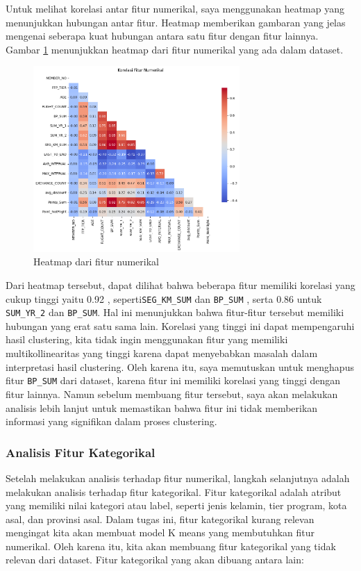 Untuk melihat korelasi antar fitur numerikal, saya menggunakan heatmap yang menunjukkan hubungan antar fitur. Heatmap memberikan gambaran yang jelas mengenai seberapa kuat hubungan antara satu fitur dengan fitur lainnya. Gambar \ref{fig:heatmap} menunjukkan heatmap dari fitur numerikal yang ada dalam dataset.

\begin{figure}[H]
    \centering
    \includegraphics[width=0.7\textwidth]{gambar/heatmap.png}
    \caption{Heatmap dari fitur numerikal}
    \label{fig:heatmap}
\end{figure}

Dari heatmap tersebut, dapat dilihat bahwa beberapa fitur memiliki korelasi yang cukup tinggi yaitu 0.92 , seperti\texttt{SEG\_KM\_SUM} dan \texttt{BP\_SUM} , serta 0.86 untuk \texttt{SUM\_YR\_2} dan \texttt{BP\_SUM}. Hal ini menunjukkan bahwa fitur-fitur tersebut memiliki hubungan yang erat satu sama lain. Korelasi yang tinggi ini dapat mempengaruhi hasil clustering, kita tidak ingin menggunakan fitur yang memiliki multikollinearitas yang tinggi karena dapat menyebabkan masalah dalam interpretasi hasil clustering. Oleh karena itu, saya memutuskan untuk menghapus fitur \texttt{BP\_SUM} dari dataset, karena fitur ini memiliki korelasi yang tinggi dengan fitur lainnya. Namun sebelum membuang fitur tersebut, saya akan melakukan analisis lebih lanjut untuk memastikan bahwa fitur ini tidak memberikan informasi yang signifikan dalam proses clustering.

\subsubsection{Analisis Fitur Kategorikal}
Setelah melakukan analisis terhadap fitur numerikal, langkah selanjutnya adalah melakukan analisis terhadap fitur kategorikal. Fitur kategorikal adalah atribut yang memiliki nilai kategori atau label, seperti jenis kelamin, tier program, kota asal, dan provinsi asal. Dalam tugas ini, fitur kategorikal kurang relevan mengingat kita akan membuat model K means yang membutuhkan fitur numerikal. Oleh karena itu, kita akan membuang fitur kategorikal yang tidak relevan dari dataset. Fitur kategorikal yang akan dibuang antara lain:

